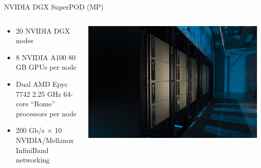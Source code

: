\begin{frame}{NVIDIA DGX SuperPOD (MP)}
\begin{columns}
\begin{column}{0.5\textwidth}
\begin{itemize}
\item 20 NVIDIA DGX nodes
\item 8 NVIDIA A100 80 GB GPUs per node
\item Dual AMD Epyc 7742 2.25 GHz 64-core ``Rome'' processors per node
\item 200 Gb/s \(\times\) 10 NVIDIA/Mellanox InfiniBand networking
\end{itemize}
\end{column}
\begin{column}{0.5\textwidth}
\begin{center}
\includegraphics[width=\textwidth]{figures/superpod.jpg}
\end{center}
\end{column}
\end{columns}
\end{frame}

